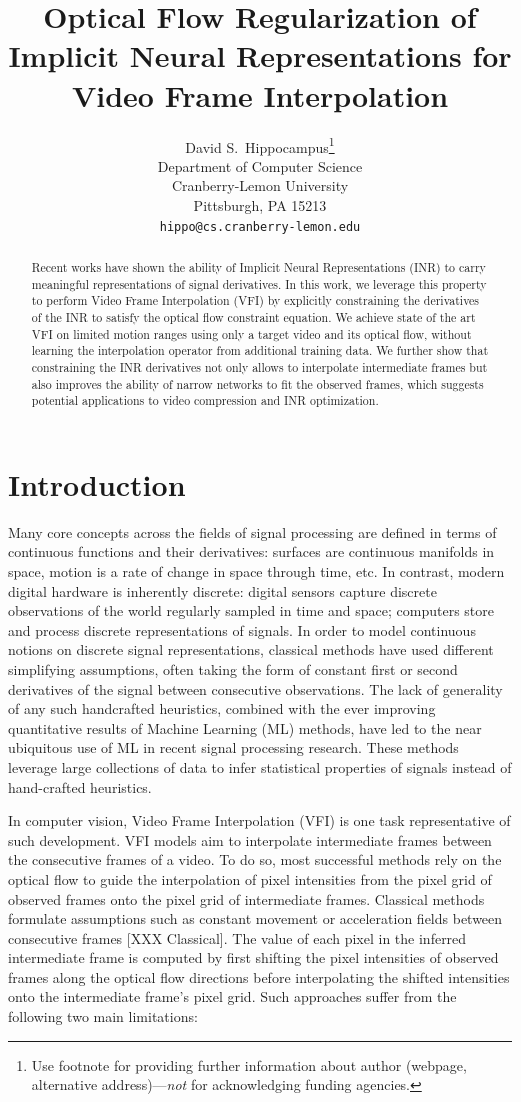 \documentclass{article}
\title{Optical Flow Regularization of Implicit Neural Representations for Video Frame Interpolation}
\author{%
  David S.~Hippocampus\thanks{Use footnote for providing further information
    about author (webpage, alternative address)---\emph{not} for acknowledging
    funding agencies.} \\
  Department of Computer Science\\
  Cranberry-Lemon University\\
  Pittsburgh, PA 15213 \\
  \texttt{hippo@cs.cranberry-lemon.edu} \\
}
\begin{document}
\maketitle


\begin{abstract}
Recent works have shown the ability of Implicit Neural Representations (INR) to carry meaningful representations of signal derivatives.
In this work, we leverage this property to perform Video Frame Interpolation (VFI)
by explicitly constraining the derivatives of the INR to satisfy the optical flow constraint equation.
We achieve state of the art VFI on limited motion ranges
using only a target video and its optical flow, without learning the interpolation operator from additional training data.
We further show that constraining the INR derivatives not only
allows to interpolate intermediate frames but also improves the ability of narrow networks to fit the observed frames,
which suggests potential applications to video compression and INR optimization.
\end{abstract}

\section{Introduction}

Many core concepts across the fields of signal processing are defined in terms of continuous functions and their derivatives:
surfaces are continuous manifolds in space,
motion is a rate of change in space through time, etc.
In contrast, modern digital hardware is inherently discrete:
digital sensors capture discrete observations of the world regularly sampled in time and space;
computers store and process discrete representations of signals.
In order to model continuous notions on discrete signal representations,
classical methods have used different simplifying assumptions,
often taking the form of constant first or second derivatives
of the signal between consecutive observations.
The lack of generality of any such handcrafted heuristics,
combined with the ever improving quantitative results of Machine Learning (ML) methods,
have led to the near ubiquitous use of ML in recent signal processing research.
These methods leverage large collections of data to infer statistical properties of signals instead of hand-crafted heuristics.

In computer vision, Video Frame Interpolation (VFI) is one task representative of such development.
VFI models aim to interpolate intermediate frames between the consecutive frames of a video.
To do so, most successful methods rely on the optical flow
to guide the interpolation of pixel intensities from the pixel grid of observed frames onto the pixel grid of intermediate frames.
Classical methods formulate assumptions such as constant movement or acceleration fields between consecutive frames [XXX Classical].
The value of each pixel in the inferred intermediate frame is computed by first shifting the pixel intensities of observed frames along the
optical flow directions before interpolating the shifted intensities onto the intermediate frame's pixel grid.
Such approaches suffer from the following two main limitations:
\end{document}
